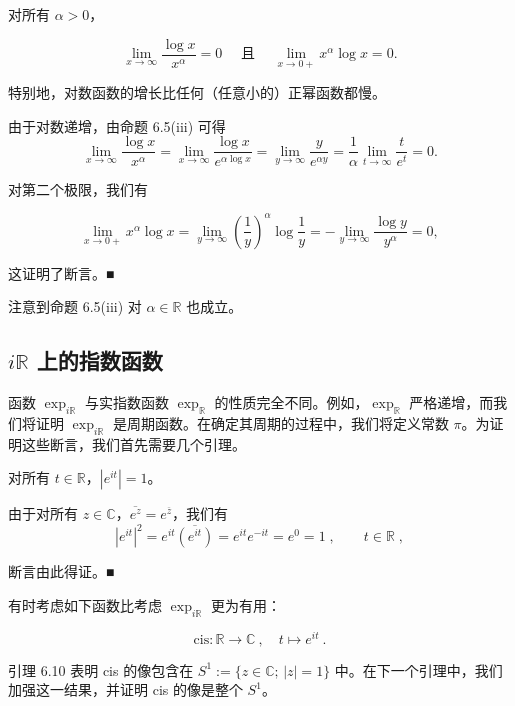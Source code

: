 \begin{proposition}

对所有 $ \alpha > 0 $，

\[
\lim_{x\to\infty}\frac{\log x}{x^{\alpha}}=0\quad\text{ 且 }\quad\lim_{x\to0+}x^{\alpha}\log x=0.
\]

特别地，对数函数的增长比任何（任意小的）正幂函数都慢。

\proofhead
由于对数递增，由命题 6.5(iii) 可得
\[
\lim_{x\to\infty}\frac{\log x}{x^{\alpha}}=\lim_{x\to\infty}\frac{\log x}{e^{\alpha\log x}}=\lim_{y\to\infty}\frac{y}{e^{\alpha y}}=\frac{1}{\alpha}\lim_{t\to\infty}\frac{t}{e^{t}}=0.
\]

对第二个极限，我们有

\[
\lim_{x\to0+}x^{\alpha}\log x=\lim_{y\to\infty}\left(\frac{1}{y}\right)^{\alpha}\log\frac{1}{y}=-\lim_{y\to\infty}\frac{\log y}{y^{\alpha}}=0,
\]

这证明了断言。■

\end{proposition}

注意到命题 6.5(iii) 对 $ \alpha \in \mathbb{R} $ 也成立。

\subsection*{$ i\mathbb{R} $ 上的指数函数}

函数 $ \exp_{i\mathbb{R}} $ 与实指数函数 $ \exp_{\mathbb{R}} $ 的性质完全不同。例如，$ \exp_{\mathbb{R}} $ 严格递增，而我们将证明 $ \exp_{i\mathbb{R}} $ 是周期函数。在确定其周期的过程中，我们将定义常数 $ \pi $。为证明这些断言，我们首先需要几个引理。

\begin{lemma}

对所有 $ t \in \mathbb{R} $，$ |e^{it}| = 1 $。

\proofhead
由于对所有 $ z \in \mathbb{C} $，$ \overline{e^z} = e^{\overline{z}} $，我们有
\[
|e^{i t}|^{2}=e^{i t}\overline{{(e^{i t})}}=e^{i t}e^{-i t}=e^{0}=1\;,\qquad t\in\mathbb{R}\;,
\]

断言由此得证。■

\end{lemma}

有时考虑如下函数比考虑 $ \exp_{i\mathbb{R}} $ 更为有用：

\[
\mathrm{c i s}\colon\mathbb{R}\to\mathbb{C}~,\quad t\mapsto e^{i t}~.
\]

引理 6.10 表明 cis 的像包含在 $ S^1 := \{ z \in \mathbb{C} ; \, |z| = 1 \} $ 中。在下一个引理中，我们加强这一结果，并证明 cis 的像是整个 $ S^1 $。


